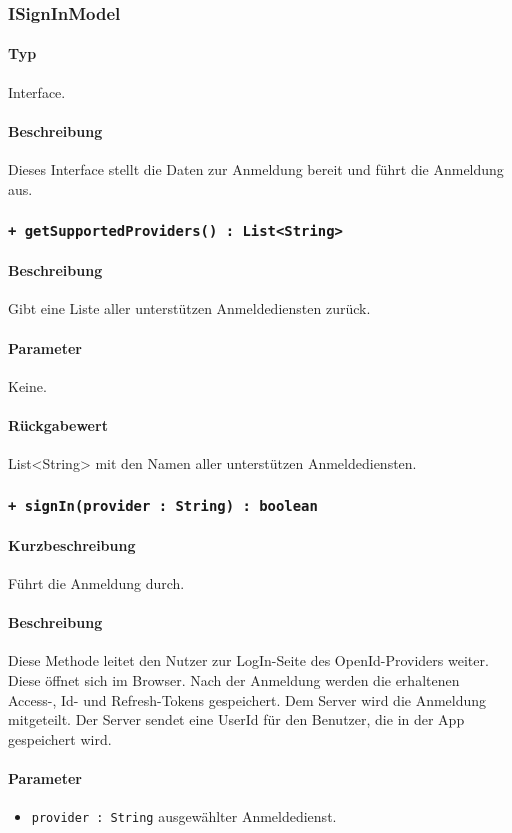 \subsubsection{ISignInModel}
\paragraph*{Typ}
Interface.
\paragraph*{Beschreibung}
Dieses Interface stellt die Daten zur Anmeldung bereit und führt die Anmeldung aus.

\subsubsection{\texttt{+ getSupportedProviders() : List<String>}}%
\paragraph*{Beschreibung}
Gibt eine Liste aller unterstützen Anmeldediensten zurück.
\paragraph*{Parameter}
Keine.
\paragraph*{Rückgabewert}
List<String> mit den Namen aller unterstützen Anmeldediensten.

\subsubsection{\texttt{+ signIn(provider : String) : boolean}}%
\paragraph*{Kurzbeschreibung}
Führt die Anmeldung durch.
\paragraph*{Beschreibung}
Diese Methode leitet den Nutzer zur LogIn-Seite des OpenId-Providers weiter.
Diese öffnet sich im Browser. Nach der Anmeldung werden die erhaltenen Access-, Id- und Refresh-Tokens gespeichert.
Dem Server wird die Anmeldung mitgeteilt. Der Server sendet eine UserId für den Benutzer, die in der App gespeichert wird.
\paragraph*{Parameter}
\begin{itemize}
    \item \texttt{provider : String} ausgewählter Anmeldedienst.
\end{itemize}
